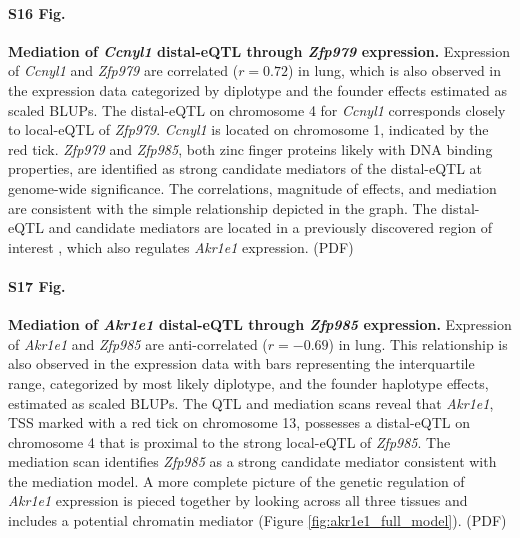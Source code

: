 \documentclass[10pt,letterpaper]{article}
\begin{document}
\paragraph*{S16 Fig.}
\label{S_ccnyl1_exmediation}
{\bf Mediation of \textit{Ccnyl1} distal-eQTL through \textit{Zfp979} expression.}
Expression of \textit{Ccnyl1} and \textit{Zfp979} are correlated ($r = 0.72$) in lung, which is also observed in the expression data categorized by diplotype and the founder effects estimated as scaled BLUPs. The distal-eQTL on chromosome 4 for \textit{Ccnyl1} corresponds closely to local-eQTL of \textit{Zfp979}. \textit{Ccnyl1} is located on chromosome 1, indicated by the red tick. \textit{Zfp979} and \textit{Zfp985}, both zinc finger proteins likely with DNA binding properties, are identified as strong candidate mediators of the distal-eQTL at genome-wide significance. The correlations, magnitude of effects, and mediation are consistent with the simple relationship depicted in the graph. The distal-eQTL and candidate mediators are located in a previously discovered region of interest \cite{HamiltonWilliams2013}, which also regulates \textit{Akr1e1} expression. (PDF)

\paragraph*{S17 Fig.}
\label{S_akr1e1_exmediation}
{\bf Mediation of \textit{Akr1e1} distal-eQTL through \textit{Zfp985} expression.}
Expression of \textit{Akr1e1} and \textit{Zfp985} are anti-correlated ($r = -0.69$) in lung. This relationship is also observed in the expression data with bars representing the interquartile range, categorized by most likely diplotype, and the founder haplotype effects, estimated as scaled BLUPs. The QTL and mediation scans reveal that \textit{Akr1e1}, TSS marked with a red tick on chromosome 13, possesses a distal-eQTL on chromosome 4 that is proximal to the strong local-eQTL of \textit{Zfp985}. The mediation scan identifies \textit{Zfp985} as a strong candidate mediator consistent with the mediation model. A more complete picture of the genetic regulation of \textit{Akr1e1} expression is pieced together by looking across all three tissues and includes a potential chromatin mediator (Figure \ref{fig:akr1e1_full_model}). (PDF)
\end{document}
